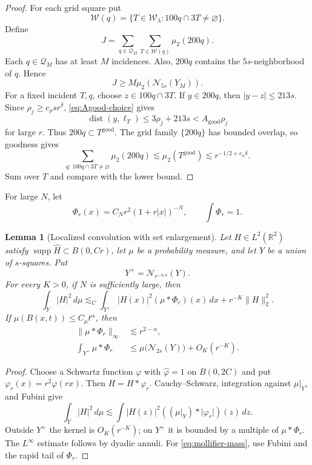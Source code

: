 \documentclass[11pt,letterpaper]{amsart}
\newtheorem{lemma}[lemma]{Lemma}
\newcommand{\R}{\mathbb{R}}
\newcommand{\supp}{\operatorname{supp}}
\newcommand{\dist}{\operatorname{dist}}
\newcommand{\cN}{\mathcal{N}}
\newcommand{\wh}{\widehat}
\newcommand{\cW}{\mathcal{W}}
\newcommand{\cQ}{\mathcal{Q}}
\newcommand{\abs}[1]{\lvert#1\rvert}
\newcommand{\norm}[1]{\lVert#1\rVert}
\begin{document}
\begin{proof}
For each grid square put
\[
 \cW(q)=\{T\in\cW_\lambda:100q\cap3T\ne\varnothing\}.
\]
Define
\[
 J=\sum_{q\in\cQ_M}\sum_{T\in\cW(q)}\mu_2(200q).
\]
Each \(q\in\cQ_M\) has at least \(M\) incidences.  Also, \(200q\)
contains the \(5s\)-neighborhood of \(q\).  Hence
\[
 J\ge M\mu_2(\cN_{5s}(Y_M)).
\]
For a fixed incident \(T,q\), choose \(z\in100q\cap3T\).  If \(y\in200q\),
then \(\abs{y-z}\le213s\).  Since
\(\rho_j\ge c_\rho sr^\delta\), \eqref{eq:Agood-choice} gives
\[
 \dist(y,\ell_T)\le3\rho_j+213s
 <A_{\mathrm{good}}\rho_j
\]
for large \(r\).  Thus \(200q\subset T^{\mathrm{good}}\).  The grid family
\(\{200q\}\) has bounded overlap, so goodness gives
\[
 \sum_{q:\,100q\cap3T\ne\varnothing}\mu_2(200q)
 \lesssim\mu_2(T^{\mathrm{good}})
 \lesssim r^{-1/2+c_\alpha\delta}.
\]
Sum over \(T\) and compare with the lower bound.
\end{proof}

For large \(N\), let
\[
 \Phi_r(x)=C_Nr^2(1+r\abs{x})^{-N},\qquad \int\Phi_r=1.
\]

\begin{lemma}[Localized convolution with set enlargement]
\label{lem:local-constancy}
Let \(H\in L^2(\R^2)\) satisfy
\(\supp\wh H\subset B(0,Cr)\), let \(\mu\) be a probability measure, and let
\(Y\) be a union of \(s\)-squares.  Put
\[
 Y^+=\cN_{r^{-3/4}}(Y).
\]
For every \(K>0\), if \(N\) is sufficiently large, then
\begin{equation}\label{eq:local-convolution}
 \int_Y\abs{H}^2\,d\mu
 \lesssim_C
 \int_{Y^+}\abs{H(x)}^2(\mu*\Phi_r)(x)\,dx
 +r^{-K}\norm{H}_2^2.
\end{equation}
If \(\mu(B(x,t))\le C_\mu t^\alpha\), then
\begin{align}
 \norm{\mu*\Phi_r}_\infty
 &\lesssim r^{2-\alpha},
 \label{eq:mollifier-Linfty}\\
 \int_{Y^+}\mu*\Phi_r
 &\le\mu\bigl(\cN_{2s}(Y)\bigr)+O_K(r^{-K}).
 \label{eq:mollifier-mass}
\end{align}
\end{lemma}

\begin{proof}
Choose a Schwartz function \(\varphi\) with
\(\wh\varphi=1\) on \(B(0,2C)\) and put
\(\varphi_r(x)=r^2\varphi(rx)\).  Then \(H=H*\varphi_r\).
Cauchy--Schwarz, integration against \(\mu|_Y\), and Fubini give
\[
 \int_Y\abs{H}^2\,d\mu
 \lesssim
 \int\abs{H(z)}^2
 ((\mu|_Y)*\abs{\varphi_r})(z)\,dz.
\]
Outside \(Y^+\) the kernel is \(O_K(r^{-K})\); on \(Y^+\) it is bounded by
a multiple of \(\mu*\Phi_r\).  The \(L^\infty\) estimate follows by dyadic
annuli.  For \eqref{eq:mollifier-mass}, use Fubini and the rapid tail of
\(\Phi_r\).
\end{proof}
\end{document}
